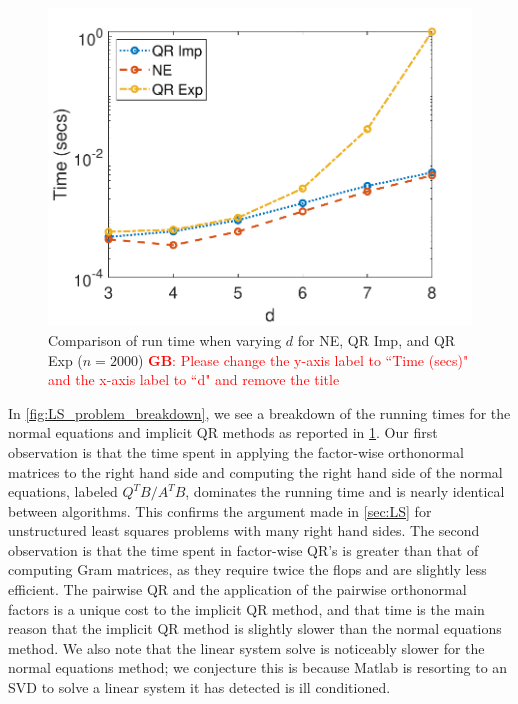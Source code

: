 \documentclass{article}
\newcommand{\GB}[1]{\textcolor{red}{\textbf{GB}: #1}}
\begin{document}
\begin{figure}[ht!]
  \begin{center}
    \includegraphics[scale = 0.7]{lineplot_p.pdf}
    \caption[Figure]{Comparison of run time when varying $d$ for NE, QR Imp, and QR Exp ($n=2000$) \GB{Please change the y-axis label to ``Time (secs)" and the x-axis label to ``d" and remove the title} \label{fig:LS_problem_line}}
  \end{center}
\end{figure}

In \cref{fig:LS_problem_breakdown}, we see a breakdown of the running times for the normal equations and implicit QR methods as reported in \cref{fig:LS_problem_line}.
Our first observation is that the time spent in applying the factor-wise orthonormal matrices to the right hand side and computing the right hand side of the normal equations, labeled $Q^TB/A^TB$, dominates the running time and is nearly identical between algorithms.
This confirms the argument made in \cref{sec:LS} for unstructured least squares problems with many right hand sides.
The second observation is that the time spent in factor-wise QR's is greater than that of computing Gram matrices, as they require twice the flops and are slightly less efficient.
The pairwise QR and the application of the pairwise orthonormal factors is a unique cost to the implicit QR method, and that time is the main reason that the implicit QR method is slightly slower than the normal equations method.
We also note that the linear system solve is noticeably slower for the normal equations method; we conjecture this is because Matlab is resorting to an SVD to solve a linear system it has detected is ill conditioned.
\end{document}
